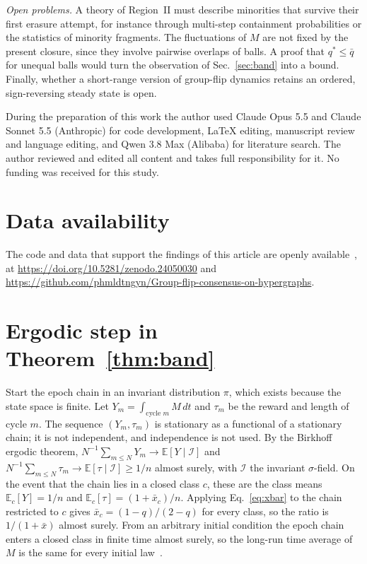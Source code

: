 \documentclass[aps,pre,reprint,superscriptaddress,amsmath,amssymb,longbibliography]{revtex4-2}
\theoremstyle{remark}
\newcommand{\E}{\mathbb{E}}
\begin{document}
\emph{Open problems.} A theory of Region~II must describe minorities that
survive their first erasure attempt, for instance through multi-step
containment probabilities or the statistics of minority fragments. The
fluctuations of $M$ are not fixed by the present closure, since they
involve pairwise overlaps of balls. A proof that $q^\ast\le\bar q$ for
unequal balls would turn the observation of Sec.~\ref{sec:band} into a
bound. Finally, whether a short-range version of group-flip dynamics
retains an ordered, sign-reversing steady state is open.

\begin{acknowledgments}
During the preparation of this work the author used Claude Opus 5.5 and
Claude Sonnet 5.5 (Anthropic) for code development, LaTeX editing,
manuscript review and language editing, and Qwen 3.8 Max (Alibaba) for
literature search. The author reviewed and edited all content and takes
full responsibility for it. No funding was received for this study.
\end{acknowledgments}

\section*{Data availability}
The code and data that support the findings of this article are openly
available~\cite{repo}, at
\url{https://doi.org/10.5281/zenodo.24050030} and
\url{https://github.com/phmldtngyn/Group-flip-consensus-on-hypergraphs}.

\appendix

\section{Ergodic step in Theorem~\ref{thm:band}}
\label{app:ergodic}

Start the epoch chain in an invariant distribution $\pi$, which exists
because the state space is finite. Let $Y_m=\int_{\text{cycle }m}M\,dt$
and $\tau_m$ be the reward and length of cycle $m$. The sequence
$(Y_m,\tau_m)$ is stationary as a functional of a stationary chain; it is
not independent, and independence is not used. By the Birkhoff ergodic
theorem, $N^{-1}\sum_{m\le N}Y_m\to\E[Y\mid\mathcal I]$ and
$N^{-1}\sum_{m\le N}\tau_m\to\E[\tau\mid\mathcal I]\ge1/n$ almost
surely, with $\mathcal I$ the invariant $\sigma$-field. On the event that
the chain lies in a closed class $c$, these are the class means
$\E_c[Y]=1/n$ and $\E_c[\tau]=(1+\bar x_c)/n$. Applying
Eq.~\eqref{eq:xbar} to the chain restricted to $c$ gives
$\bar x_c=(1-q)/(2-q)$ for every class, so the ratio is $1/(1+\bar x)$
almost surely. From an arbitrary initial condition the epoch chain
enters a closed class in finite time almost surely, so the long-run
time average of $M$ is the same for every initial law~\cite{SM}.


\end{document}
